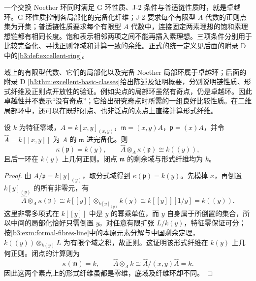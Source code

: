 \ProseParagraphBreak
一个交换 Noether 环同时满足 G 环性质、J-2 条件与普适链性质时，就是卓越环。G 环性质控制各局部化的完备化纤维；J-2 要求每个有限型 \(A\) 代数的正则点集为开集；普适链性质要求每个有限型 \(A\) 代数中，连接固定两素理想的饱和素理想链都有相同长度。饱和表示相邻两项之间不能再插入素理想。三项条件分别用于比较完备化、寻找正则邻域和计算一致的余维。正式的统一定义见后面的附录 D 中的\cref{b3:def:excellent-ring}。

\ProseParagraphBreak
域上的有限型代数、它们的局部化以及完备 Noether 局部环属于卓越环；后面的附录 D \cref{b3:thm:excellent-basic-classes}给出陈述及证明概要，分别说明链性质、形式纤维及正则点开放性的验证。例如尖点的局部环虽然有奇点，仍是卓越环。因此卓越性并不表示“没有奇点”；它给出研究奇点时所需的一组良好比较性质。在二维局部环中，还可以在既非闭点、也非泛点的素点上直接计算形式纤维。

\begin{lemma}\label{b3:lem:C-plane-formal-fibre}
	设 \(k\) 为特征零域，\(A=k[x,y]_{(x,y)}\)，\(\mathfrak m=(x,y)A\)，\(\mathfrak p=(x)A\)，并令 \(\widehat A=k[\![x,y]\!]\) 为 \(A\) 的 \(\mathfrak m\)-进完备化。则
	\[
		\kappa(\mathfrak p)=k(y),\qquad \widehat A\otimes_A\kappa(\mathfrak p)\cong k(\!(y)\!),
	\]
	且后一环在 \(k(y)\) 上几何正则。闭点 \(\mathfrak m\) 的剩余域与形式纤维均为 \(k\)。
\end{lemma}
\begin{proof}
	由 \(A/\mathfrak p=k[y]_{(y)}\)，取分式域得到 \(\kappa(\mathfrak p)=k(y)\)。先模掉 \(x\)，再倒置 \(k[y]_{(y)}\) 的所有非零元，有
	\[
		\widehat A\otimes_A\kappa(\mathfrak p) \cong k[\![y]\!]\otimes_{k[y]_{(y)}}k(y) \cong k[\![y]\!][1/y] =k(\!(y)\!).
	\]
	这里非零多项式在 \(k[\![y]\!]\) 中是 \(y\) 的幂乘单位，而 \(y\) 自身属于所倒置的集合，所以中间的局部化恰好只需倒置 \(y\)。对任意有限扩张 \(L/k(y)\)，特征零保证可分；按\cref{b3:exm:formal-fibres-line}中的本原元素分解与中国剩余定理，\(k(\!(y)\!)\otimes_{k(y)}L\) 为有限个域之积，故正则。这证明该形式纤维在 \(k(y)\) 上几何正则。闭点的计算则为
	\[
		\kappa(\mathfrak m)=k,\qquad \widehat A\otimes_Ak \cong\widehat A/(x,y)\widehat A=k.
	\]
	因此这两个素点上的形式纤维虽都是零维，底域及纤维环却不同。
\end{proof}

